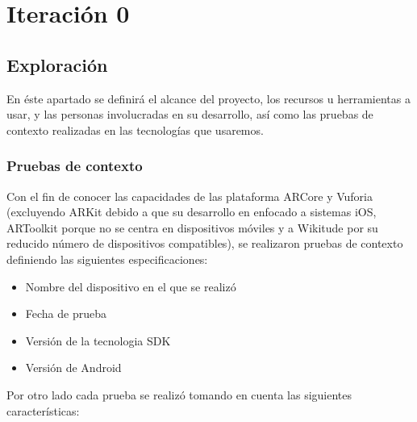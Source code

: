 \section{Iteración 0}
\subsection{Exploración}
En éste apartado se definirá el alcance del proyecto, los recursos u herramientas a usar, y las personas involucradas en su desarrollo, así como las pruebas de contexto realizadas en las tecnologías que usaremos.


\subsubsection{Pruebas de contexto}
Con el fin de conocer las capacidades de las plataforma ARCore y Vuforia (excluyendo ARKit debido a que su desarrollo en enfocado a sistemas iOS, ARToolkit porque no se centra en dispositivos móviles y a Wikitude por su reducido número de dispositivos compatibles), se realizaron pruebas de contexto definiendo las siguientes especificaciones:
\begin{itemize}
	\item Nombre del dispositivo en el que se realizó
	\item Fecha de prueba
	\item Versión de la tecnologia SDK
	\item Versión de Android
\end{itemize}
Por otro lado cada prueba se realizó tomando en cuenta las siguientes características:
